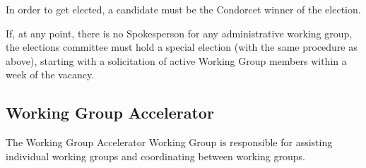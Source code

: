 \documentclass{article}
\begin{document}
In order to get elected, a candidate must be the Condorcet winner of the election. 

If, at any point, there is no Spokesperson for any administrative working group, the elections committee must hold a special election (with the same procedure as above), starting with a solicitation of active Working Group members within a week of the vacancy.

\subsection{Working Group Accelerator} %

The Working Group Accelerator Working Group is responsible for assisting individual working groups and coordinating between working groups.








\end{document}
